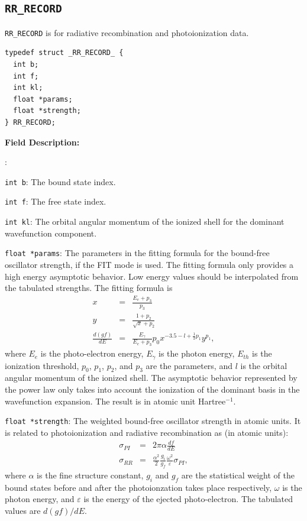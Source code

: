 \documentclass[twoside,letterpaper]{refrep}
\newenvironment{dbdesc}{\textbf{Field Description:} \begin{list}
	{:}{\setlength{\labelwidth}{2in}
	   \setlength{\leftmargin}{2in}
	   \setlength{\labelsep}{0.1in}
	   \setlength{\rightmargin}{0.2in}}}
	{\end{list}}
\begin{document}
\subsection{\texttt{RR\_RECORD}}
\texttt{RR\_RECORD} is for radiative recombination and photoionization data.

\begin{verbatim}
typedef struct _RR_RECORD_ {
  int b;
  int f;
  int kl;
  float *params;
  float *strength;
} RR_RECORD;
\end{verbatim}

\begin{dbdesc}
\item[\texttt{int b}:] The bound state index.
\item[\texttt{int f}:] The free state index.
\item[\texttt{int kl}:] The orbital angular momentum of the ionized shell for
the dominant wavefunction component.
\item[\texttt{float *params}:] The parameters in the fitting formula for the
bound-free oscillator strength, if the FIT mode is
used. The fitting formula only provides a high energy asymptotic behavior. Low
energy values should be interpolated from the tabulated strengths. The fitting
formula is
\begin{eqnarray}
x &=& \frac{E_e+p_3}{p_3} \nonumber\\
y &=& \frac{1+p_2}{\sqrt{x}+p_2} \nonumber\\
\frac{d(gf)}{dE} &=&
\frac{E_\gamma}{E_e+p_3}p_0x^{-3.5-l+\frac{1}{2}p_1}y^{p_1}, 
\end{eqnarray}
where $E_e$ is the photo-electron energy, $E_\gamma$ is the photon energy,
$E_{th}$ is the ionization threshold, $p_0$, $p_1$, $p_2$, and $p_3$ are the
parameters, and $l$ is the orbital angular momentum of the ionized
shell. The asymptotic behavior represented by the power law only takes into
account the ionization of the dominant basis in the wavefunction
expansion. The result is in atomic unit Hartree$^{-1}$.
\item[\texttt{float *strength}:] The weighted bound-free oscillator strength in
atomic units. It is related to photoionization and radiative recombination as
(in atomic units):
\begin{eqnarray}
\sigma_{PI} &=& 2\pi\alpha\frac{ d f}{ d E} \nonumber\\
\sigma_{RR} &=& \frac{\alpha^2}{2}\frac{g_i}{g_f}\frac{\omega^2}{\varepsilon}
\sigma_{PI},
\end{eqnarray}
where $\alpha$ is the fine structure constant, $g_i$ and $g_f$ are the
statistical weight of the bound states before and after the photoionzation
takes place respectively, $\omega$ is the photon energy, and $\varepsilon$ is
the energy of the ejected photo-electron. The tabulated values are $d(gf)/dE$.
\end{dbdesc}
\end{document}
